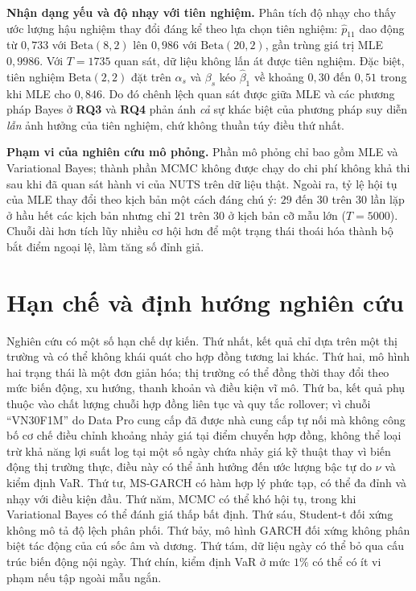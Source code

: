 \documentclass[12pt,a4paper]{article}
\numberwithin{equation}{section}
\newcommand{\RQ}[1]{\textbf{RQ#1}}
\begin{document}
\textbf{Nhận dạng yếu và độ nhạy với tiên nghiệm.} Phân tích độ nhạy cho thấy ước lượng hậu nghiệm thay đổi đáng kể theo lựa chọn tiên nghiệm: $\hat p_{11}$ dao động từ $0{,}733$ với $\mathrm{Beta}(8,2)$ lên $0{,}986$ với $\mathrm{Beta}(20,2)$, gần trùng giá trị MLE $0{,}9986$. Với $T=1735$ quan sát, dữ liệu không lấn át được tiên nghiệm. Đặc biệt, tiên nghiệm $\mathrm{Beta}(2,2)$ đặt trên $\alpha_s$ và $\beta_s$ kéo $\hat\beta_1$ về khoảng $0{,}30$ đến $0{,}51$ trong khi MLE cho $0{,}846$. Do đó chênh lệch quan sát được giữa MLE và các phương pháp Bayes ở \RQ{3} và \RQ{4} phản ánh \emph{cả} sự khác biệt của phương pháp suy diễn \emph{lẫn} ảnh hưởng của tiên nghiệm, chứ không thuần túy điều thứ nhất.

\textbf{Phạm vi của nghiên cứu mô phỏng.} Phần mô phỏng chỉ bao gồm MLE và Variational Bayes; thành phần MCMC không được chạy do chi phí không khả thi sau khi đã quan sát hành vi của NUTS trên dữ liệu thật. Ngoài ra, tỷ lệ hội tụ của MLE thay đổi theo kịch bản một cách đáng chú ý: $29$ đến $30$ trên $30$ lần lặp ở hầu hết các kịch bản nhưng chỉ $21$ trên $30$ ở kịch bản cỡ mẫu lớn ($T=5000$). Chuỗi dài hơn tích lũy nhiều cơ hội hơn để một trạng thái thoái hóa thành bộ bắt điểm ngoại lệ, làm tăng số đỉnh giả.

\section{Hạn chế và định hướng nghiên cứu}\label{sec:han-che}

Nghiên cứu có một số hạn chế dự kiến. Thứ nhất, kết quả chỉ dựa trên một thị trường và có thể không khái quát cho hợp đồng tương lai khác. Thứ hai, mô hình hai trạng thái là một đơn giản hóa; thị trường có thể đồng thời thay đổi theo mức biến động, xu hướng, thanh khoản và điều kiện vĩ mô. Thứ ba, kết quả phụ thuộc vào chất lượng chuỗi hợp đồng liên tục và quy tắc rollover; vì chuỗi ``VN30F1M'' do Data Pro cung cấp đã được nhà cung cấp tự nối mà không công bố cơ chế điều chỉnh khoảng nhảy giá tại điểm chuyển hợp đồng, không thể loại trừ khả năng lợi suất log tại một số ngày chứa nhảy giá kỹ thuật thay vì biến động thị trường thực, điều này có thể ảnh hưởng đến ước lượng bậc tự do $\nu$ và kiểm định VaR. Thứ tư, MS-GARCH có hàm hợp lý phức tạp, có thể đa đỉnh và nhạy với điều kiện đầu. Thứ năm, MCMC có thể khó hội tụ, trong khi Variational Bayes có thể đánh giá thấp bất định. Thứ sáu, Student-t đối xứng không mô tả độ lệch phân phối. Thứ bảy, mô hình GARCH đối xứng không phân biệt tác động của cú sốc âm và dương. Thứ tám, dữ liệu ngày có thể bỏ qua cấu trúc biến động nội ngày. Thứ chín, kiểm định VaR ở mức $1\%$ có thể có ít vi phạm nếu tập ngoài mẫu ngắn.
\end{document}
